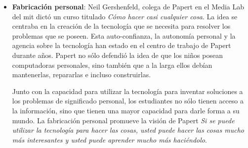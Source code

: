 \begin{itemize}


\item \textbf{Fabricación personal}: Neil Gershenfeld, colega de Papert en el
    Media Lab del \Gls{mit} dictó un curso titulado \emph{Cómo hacer casi
        cualquier cosa}. La idea se centraba en la creación de  la tecnología
    que se necesita para resolver los problemas que se poseen. Esta
    auto-confianza, la autonomía personal y la agencia sobre la tecnología han
    estado en el centro de trabajo de Papert durante años. Papert no sólo
    defendió la idea de que los niños posean computadoras personales, sino
    también que a la larga ellos debían mantenerlas, repararlas e incluso
    construirlas.

	Junto con la capacidad para utilizar la tecnología para inventar
	soluciones a los problemas de significado personal, los estudiantes no
	sólo tienen acceso a la información, sino que tienen una mayor capacidad
	para darle forma a su mundo. La fabricación personal promueve la visión
	de Papert \emph{Si se puede utilizar la tecnología para hacer las cosas,
	usted puede hacer las cosas mucho más interesantes y usted
	puede aprender mucho más haciéndolo}\cite{papertian:const}.

\end{itemize}


